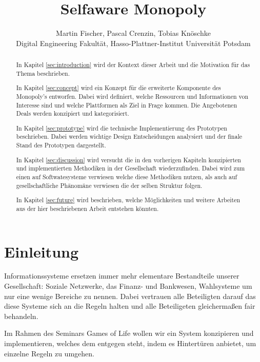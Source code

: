 \documentclass[german]{cgspaper} %
\title{Selfaware Monopoly}
\author{Martin Fischer, Pascal Crenzin, Tobias Knöschke\\ Digital Engineering Fakultät, Hasso-Plattner-Institut \textbar{} Universität Potsdam}
\begin{document}
\teaser{
}

\maketitle

\begin{abstract}
    In Kapitel \ref{sec:introduction} wird der Kontext dieser Arbeit und die Motivation für das Thema beschrieben.

    In Kapitel \ref{sec:concept} wird ein Konzept für die erweiterte Komponente des Monopoly's entworfen.
    Dabei wird definiert, welche Ressourcen und Informationen von Interesse sind und welche Plattformen als Ziel in Frage kommen.
    Die Angebotenen Deals werden konzipiert und kategorisiert.

    In Kapitel \ref{sec:prototype} wird die technische Implementierung des Prototypen beschrieben.
    Dabei werden wichtige Design Entscheidungen analysiert und der finale Stand des Prototypen dargestellt.

    In Kapitel \ref{sec:discussion} wird versucht die in den vorherigen Kapiteln konzipierten und implementierten Methodiken in der Gesellschaft wiederzufinden.
    Dabei wird zum einen auf Softwatesysteme verwiesen welche diese Methodiken nutzen, als auch auf gesellschaftliche Phänomäne verwiesen die der selben Struktur folgen.

    In Kapitel \ref{sec:future} wird beschrieben, welche Möglichkeiten und weitere Arbeiten aus der hier beschriebenen Arbeit entstehen könnten.
\end{abstract}

\copyrightspace %


\section{Einleitung}\label{sec:introduction}

Informationssysteme ersetzen immer mehr elementare Bestandteile unserer Gesellschaft: Soziale Netzwerke, das Finanz- und Bankwesen, Wahlsysteme um nur eine wenige Bereiche zu nennen.
Dabei vertrauen alle Beteiligten darauf das diese Systeme sich an die Regeln halten und alle Beteiligeten gleichermaßen fair behandeln.

Im Rahmen des Seminars Games of Life wollen wir ein System konzipieren und implementieren, welches dem entgegen steht, indem es Hintertüren anbietet, um einzelne Regeln zu umgehen.
\end{document}
